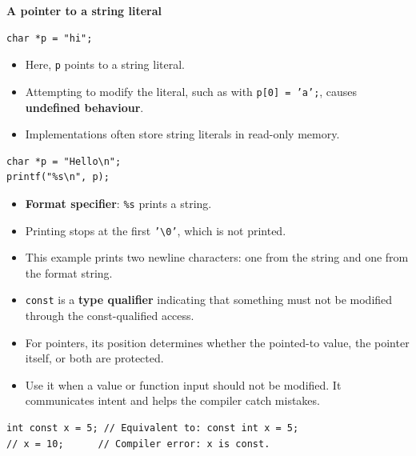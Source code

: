 \documentclass[11pt,a4paper]{article}
\begin{document}
\textbf{A pointer to a string literal}

\begin{lstlisting}[style=cscode]
char *p = "hi";
\end{lstlisting}

\begin{itemize}
    \item Here, \texttt{p} points to a string literal.
    \item Attempting to modify the literal, such as with
          \texttt{p[0] = 'a';}, causes
          \textbf{undefined behaviour}.
    \item Implementations often store string literals in
          read-only memory.
\end{itemize}


\begin{lstlisting}[style=cscode]
char *p = "Hello\n";
printf("%s\n", p);
\end{lstlisting}

\begin{itemize}
    \item \textbf{Format specifier}: \texttt{\%s} prints a string.
    \item Printing stops at the first
          \texttt{'\textbackslash0'}, which is not printed.
    \item This example prints two newline characters: one from
          the string and one from the format string.
\end{itemize}


\begin{itemize}
    \item \texttt{const} is a \textbf{type qualifier} indicating
          that something must not be modified through the
          const-qualified access.
    \item For pointers, its position determines whether the
          pointed-to value, the pointer itself, or both are
          protected.
    \item Use it when a value or function input should not be
          modified. It communicates intent and helps the compiler
          catch mistakes.
\end{itemize}

\begin{lstlisting}[style=cscode]
int const x = 5; // Equivalent to: const int x = 5;
// x = 10;      // Compiler error: x is const.
\end{lstlisting}
\end{document}
